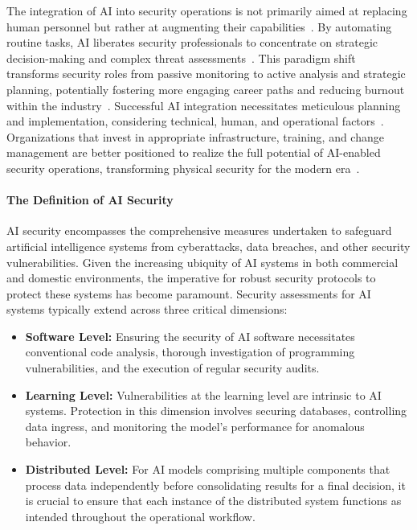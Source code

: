The integration of AI into security operations is not primarily aimed at replacing human personnel but rather at augmenting their capabilities~\cite{securityindustry_2025_transforming}. By automating routine tasks, AI liberates security professionals to concentrate on strategic decision-making and complex threat assessments~\cite{securityindustry_2025_transforming}. This paradigm shift transforms security roles from passive monitoring to active analysis and strategic planning, potentially fostering more engaging career paths and reducing burnout within the industry~\cite{securityindustry_2025_transforming}. Successful AI integration necessitates meticulous planning and implementation, considering technical, human, and operational factors~\cite{securityindustry_2025_transforming}. Organizations that invest in appropriate infrastructure, training, and change management are better positioned to realize the full potential of AI-enabled security operations, transforming physical security for the modern era~\cite{securityindustry_2025_transforming}.

\paragraph{The Definition of AI Security}
AI security encompasses the comprehensive measures undertaken to safeguard artificial intelligence systems from cyberattacks, data breaches, and other security vulnerabilities. Given the increasing ubiquity of AI systems in both commercial and domestic environments, the imperative for robust security protocols to protect these systems has become paramount. Security assessments for AI systems typically extend across three critical dimensions:
\begin{itemize}
    \item \textbf{Software Level:} Ensuring the security of AI software necessitates conventional code analysis, thorough investigation of programming vulnerabilities, and the execution of regular security audits.
    \item \textbf{Learning Level:} Vulnerabilities at the learning level are intrinsic to AI systems. Protection in this dimension involves securing databases, controlling data ingress, and monitoring the model's performance for anomalous behavior.
    \item \textbf{Distributed Level:} For AI models comprising multiple components that process data independently before consolidating results for a final decision, it is crucial to ensure that each instance of the distributed system functions as intended throughout the operational workflow.
\end{itemize}

